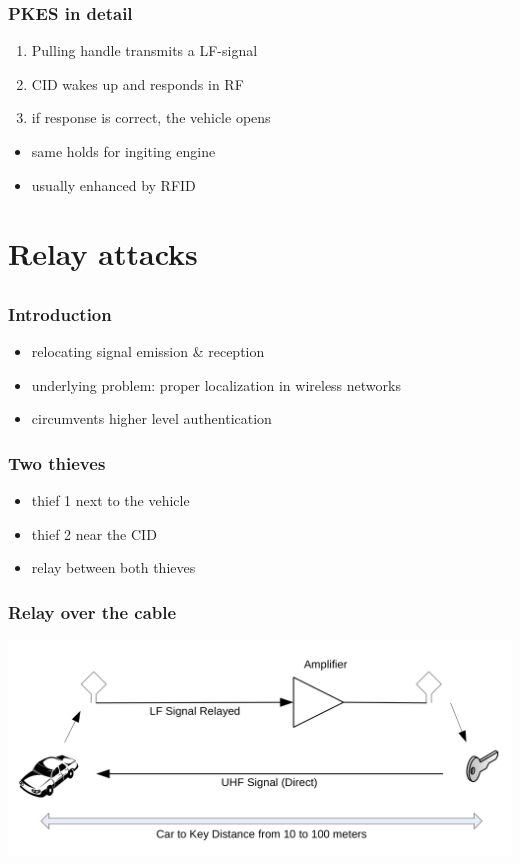 \documentclass[12pt]{beamer}
\begin{document}
	\begin{frame}
		\frametitle{PKES in detail}
		\begin{enumerate}
			\item Pulling handle transmits a LF-signal
			\item CID wakes up and responds in RF
			\item if response is correct, the vehicle opens
		\end{enumerate}
		\begin{itemize}
			\item same holds for ingiting engine
			\item usually enhanced by RFID
		\end{itemize}
	\end{frame}

\section{Relay attacks}
\subsection*{}
	\begin{frame}
	\frametitle{Introduction}
		\begin{itemize}
			\item relocating signal emission \& reception
			\item underlying problem: proper localization in wireless networks
			\item circumvents higher level authentication
		\end{itemize}
	\end{frame}

	\begin{frame}
		\frametitle{Two thieves}
		\begin{itemize}
			\item thief 1 next to the vehicle
			\item thief 2 near the CID
			\item relay between both thieves
		\end{itemize}
	\end{frame}
	
	\begin{frame}
	\frametitle{Relay over the cable}
		\begin{center}
			\includegraphics[scale=0.85]{img/franc_relay_over_the_wire.png} 
		\end{center}
	\end{frame}
	
\end{document}
